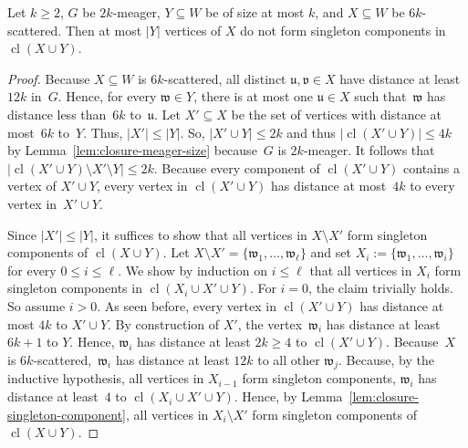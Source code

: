 \documentclass[]{lmcs}
\newcommand{\set}[1]{\lbrace #1 \rbrace}
\newcommand{\bVertA}{\mathfrak{u}}
\newcommand{\bVertB}{\mathfrak{v}}
\newcommand{\bVertC}{\mathfrak{w}}
\newcommand{\feetb}{W}
\newcommand{\footbset}{X}
\newcommand{\footbsetA}{X}
\newcommand{\footbsetB}{Y}
\newcommand{\closure}[1]{\operatorname{cl}(#1)}
\begin{document}
\begin{lem}
	\label{lem:closure-scattered-singleton-components}
	Let $k \geq 2$,
	$G$ be $2k$-meager,
	$\footbsetB \subseteq \feetb$ be of size at most $k$,
	and $\footbset\subseteq \feetb$ be $6k$-scattered.
	Then at most $|\footbsetB|$ vertices of $\footbset$
	do not form singleton components in $\closure{\footbset \cup \footbsetB}$.
\end{lem}
\begin{proof}
	Because $\footbset\subseteq \feetb$ is $6k$-scattered,
	all distinct $\bVertA,\bVertB \in \footbset$
	have distance at least~$12k$ in~$G$.
	Hence, for every $\bVertC \in \footbsetB$,
	there is at most one $\bVertA \in \footbset$
	such that~$\bVertC$ has distance less than~$6k$ to~$\bVertA$.
	Let $\footbset' \subseteq \footbset$ be the set of vertices with distance at most~$6k$ to~$\footbsetB$. 
	Thus, $|\footbset'| \leq |\footbsetB|$.
	So, $|\footbsetA' \cup \footbsetB| \leq 2k$ and thus
	$|\closure{\footbsetA'\cup \footbsetB}| \leq 4k$
	by Lemma~\ref{lem:closure-meager-size} because~$G$ is $2k$-meager.
	It follows that $|\closure{\footbsetA'\cup \footbsetB} \setminus \footbsetA' \setminus\footbsetB | \leq 2k$.
	Because every component of $\closure{\footbsetA'\cup \footbsetB}$ contains a vertex of $\footbsetA' \cup \footbsetB$,
	every vertex in $\closure{\footbsetA' \cup \footbsetB}$
	has distance at most~$4k$ to every vertex in~$\footbsetA'\cup\footbsetB$.
	
	Since $|\footbset'| \leq |\footbsetB|$,
	it suffices to show that all vertices in $\footbset\setminus \footbset'$
	form singleton components of $\closure{\footbsetA \cup \footbsetB}$.
	Let $\footbset \setminus \footbset' = \set{\bVertC_1, \dots ,\bVertC_\ell}$
	and set $\footbset_i := \set {\bVertC_1,\dots,\bVertC_i}$ for every ${0 \leq i \leq \ell}$.
	We show by induction on $i \leq \ell$
	that all vertices in $\footbset_i$ form singleton components in ${\closure{\footbset_i\cup \footbset' \cup \footbsetB}}$.
	For $i = 0$, the claim trivially holds.
	So assume $i > 0$.
	As seen before, every vertex in $\closure{\footbset' \cup \footbsetB}$ has distance at most $4k$ to $\footbset' \cup \footbsetB$.
	By construction of $\footbset'$, the vertex~$\bVertC_i$ has distance at least $6k +1$ to $\footbsetB$.
	Hence, $\bVertC_i$ has distance at least $2k \geq 4$ to  $\closure{\footbset' \cup \footbsetB}$. 
	Because~$\footbset$ is  $6k$-scattered,~$\bVertC_i$ has distance at least $12k$ to all other $\bVertC_j$.
	Because, by the inductive hypothesis,
	all vertices in $\footbset_{i-1}$ form singleton components,
	$\bVertC_i$ has distance at least~$4$ to 
	$\closure{\footbset_i \cup \footbset' \cup \footbsetB}$.
	Hence, by Lemma~\ref{lem:closure-singleton-component},
	all vertices in $\footbset_i \setminus \footbset'$
	form singleton components of $\closure{\footbset \cup \footbsetB}$.
\end{proof}
\end{document}
